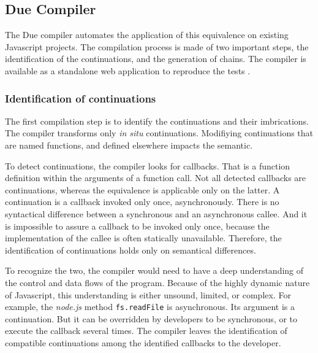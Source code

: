 \subsection{Due Compiler} \label{chapter5:due:compiler}

The Due compiler automates the application of this equivalence on existing Javascript projects.
The compilation process is made of two important steps, the identification of the continuations, and the generation of chains.
The compiler is available as a standalone web application to reproduce the tests .

\subsubsection{Identification of continuations}

The first compilation step is to identify the continuations and their imbrications.
The compiler transforms only \textit{in situ} continuations.
Modifiying continuations that are named functions, and defined elsewhere impacts the semantic.

To detect continuations, the compiler looks for callbacks.
That is a function definition within the arguments of a function call.
Not all detected callbacks are continuations, whereas the equivalence is applicable only on the latter.
A continuation is a callback invoked only once, asynchronously.
There is no syntactical difference between a synchronous and an asynchronous callee.
And it is impossible to assure a callback to be invoked only once, because the implementation of the callee is often statically unavailable.
Therefore, the identification of continuations holds only on semantical differences.

To recognize the two, the compiler would need to have a deep understanding of the control and data flows of the program.
Because of the highly dynamic nature of Javascript, this understanding is either unsound, limited, or complex.
For example, the \textit{node.js} method \texttt{fs.readFile} is asynchronous.
Its argument is a continuation.
But it can be overridden by developers to be synchronous, or to execute the callback several times.
The compiler leaves the identification of compatible continuations among the identified callbacks to the developer.

